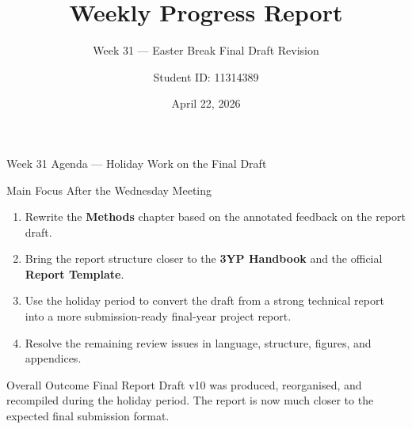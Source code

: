 \documentclass[aspectratio=169, 11pt]{beamer}
\title{Weekly Progress Report}
\subtitle{Week 31 --- Easter Break Final Draft Revision}
\author{Student ID: 11314389}
\institute{BCI Control System Project}
\date{April 22, 2026}
\begin{document}
\begin{frame}
    \titlepage
\end{frame}

\begin{frame}[shrink=8]{Week 31 Agenda --- Holiday Work on the Final Draft}

    \begin{block}{Main Focus After the Wednesday Meeting}
        \begin{enumerate}
            \item Rewrite the \textbf{Methods} chapter based on the annotated feedback on the report draft.
            \item Bring the report structure closer to the \textbf{3YP Handbook} and the official \textbf{Report Template}.
            \item Use the holiday period to convert the draft from a strong technical report into a more submission-ready final-year project report.
            \item Resolve the remaining review issues in language, structure, figures, and appendices.
        \end{enumerate}
    \end{block}

    \vspace{2mm}
    \begin{alertblock}{Overall Outcome}
        Final Report Draft v10 was produced, reorganised, and recompiled during the holiday period. The report is now much closer to the expected final submission format.
    \end{alertblock}
\end{frame}
\end{document}
